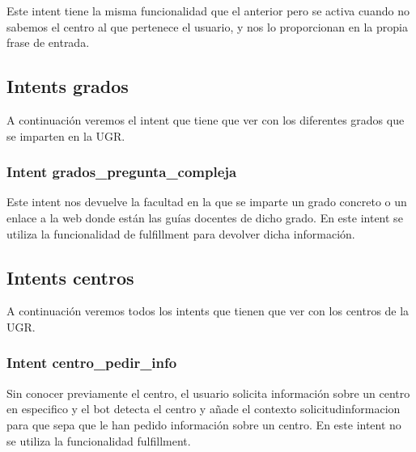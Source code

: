\vspace{5 mm}

Este intent tiene la misma funcionalidad que el anterior pero se activa cuando no sabemos el centro al que pertenece el usuario, y nos lo proporcionan en la propia frase de entrada.

\vspace{5 mm}


\subsection{Intents grados}

\vspace{5 mm}

A continuación veremos el intent que tiene que ver con los diferentes grados que se imparten en la UGR.

\vspace{5 mm}

\subsubsection{Intent grados_pregunta_compleja}

\vspace{5 mm}

Este intent nos devuelve la facultad en la que se imparte un grado concreto o un enlace a la web donde están las guías docentes de dicho grado. En este intent se utiliza la funcionalidad de fulfillment para devolver dicha información.

\vspace{5 mm}

\subsection{Intents centros}

\vspace{5 mm}

A continuación veremos todos los intents que tienen que ver con los centros de la UGR.

\vspace{5 mm}

\subsubsection{Intent centro_pedir_info}

\vspace{5 mm}

Sin conocer previamente el centro, el usuario solicita información sobre un centro en especifico y el bot detecta el centro y añade el contexto solicitudinformacion para que sepa que le han pedido información sobre un centro. En este intent no se utiliza la funcionalidad fulfillment.

